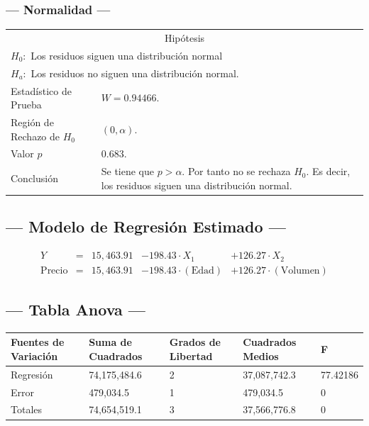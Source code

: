 \subsubsection{--- Normalidad ---} %
\begin{center}
  \begin{tabular}{|l|p{8cm}|}
    \cline{1-2}
    \multicolumn{2}{|c|}{Hipótesis}\\ \cline{1-2}
    \multicolumn{2}{|l|}{\(H_0:\) Los residuos siguen una distribución normal} \\ 
    \multicolumn{2}{|l|}{\(H_a:\) Los residuos no siguen una distribución normal.} \\ \cline{1-2}
    Estadístico de Prueba & \(W = 0.94466\).\\ \cline{1-2} 
		Región de Rechazo de \(H_0\) & \((0, \alpha )\).\\ \cline{1-2} 
    Valor \(p\) & \(0.683\).\\ \cline{1-2} 
    Conclusión & Se tiene que \(p> \alpha\). \newline 
		Por tanto no se rechaza \(H_0\). \newline 
		Es decir, los residuos siguen una distribución normal.\\ \cline{1-2} 
  \end{tabular}
\end{center}


\subsection{\centering --- Modelo de Regresión Estimado ---} %
\begin{align}
	Y & = &               15,463.91 & - 198.43 \cdot X_1           & + 126.27     \cdot X_2   \\[2mm]
	\mbox{Precio} & = &   15,463.91 & - 198.43 \cdot (\mbox{Edad}) & + 126.27     \cdot (\mbox{Volumen})
	\label{eq:3}
\end{align}

\subsection{\centering --- Tabla Anova ---} %
\begin{center}
  \begin{tabular}{|l|l|l|l|l|}
    \hline 
		Fuentes de Variación  & Suma de Cuadrados & Grados de Libertad & Cuadrados Medios & F\\ \hline 
		Regresión & 74,175,484.6 & 2 & 37,087,742.3 & 77.42186 \\ \hline
		Error     &    479,034.5 & 1 &    479,034.5 &  0 \\ \hline
		Totales   & 74,654,519.1 & 3 & 37,566,776.8 &  0 \\ \hline
  \end{tabular}
\end{center} 

